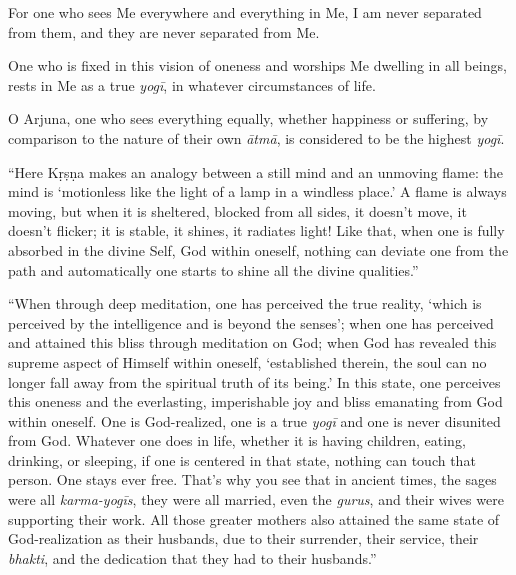{For one who sees Me everywhere and everything in Me, I am never separated from them, and they are never separated from Me.}

{One who is fixed in this vision of oneness and worships Me dwelling in all beings, rests in Me as a true \textit{yogī}, in whatever circumstances of life.}

{O Arjuna, one who sees everything equally, whether happiness or suffering, by comparison to the nature of their own \textit{ātmā}, is considered to be the highest \textit{yogī}.}

\enquote{Here Kṛṣṇa makes an analogy between a still mind and an unmoving flame: the mind is \enquote{motionless like the light of a lamp in a windless place.} A flame is always moving, but when it is sheltered, blocked from all sides, it doesn’t move, it doesn’t flicker; it is stable, it shines, it radiates light! Like that, when one is fully absorbed in the divine Self, God within oneself, nothing can deviate one from the path and automatically one starts to shine all the divine qualities.}

\enquote{When through deep meditation, one has perceived the true reality, \enquote{which is perceived by the intelligence and is beyond the senses}; when one has perceived and attained this bliss through meditation on God; when God has revealed this supreme aspect of Himself within oneself, \enquote{established therein, the soul can no longer fall away from the spiritual truth of its being.} In this state, one perceives this oneness and the everlasting, imperishable joy and bliss emanating from God within oneself. One is God-realized, one is a true \textit{yogī} and one is never disunited from God. Whatever one does in life, whether it is having children, eating, drinking, or sleeping, if one is centered in that state, nothing can touch that person. One stays ever free. That’s why you see that in ancient times, the sages were all \textit{karma-yogīs}, they were all married, even the \textit{gurus}, and their wives were supporting their work. All those greater mothers also attained the same state of God-realization as their husbands, due to their surrender, their service, their \textit{bhakti}, and the dedication that they had to their husbands.}

